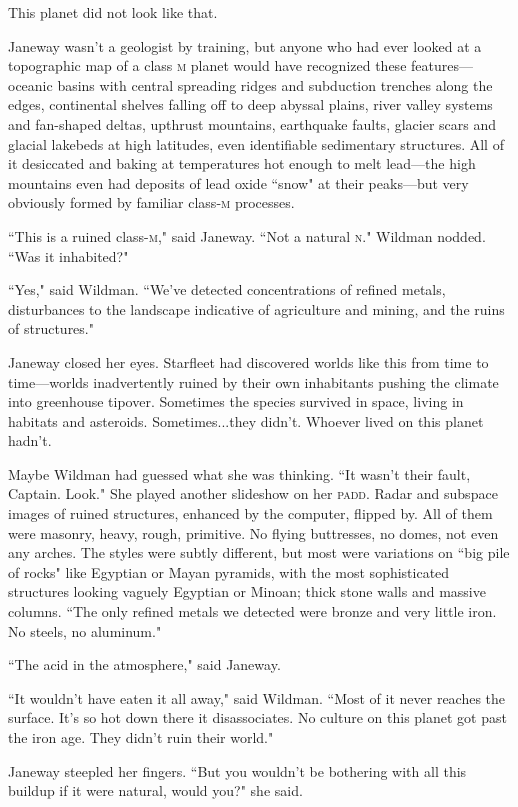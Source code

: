 \documentclass[twoside,letterpaper,12pt]{memoir}
\begin{document}
This planet did not look like that.

Janeway wasn't a geologist by training, but anyone who had ever looked at a topographic map of a class \textsc{m} planet would have recognized these features---oceanic basins with central spreading ridges and subduction trenches along the edges, continental shelves falling off to deep abyssal plains, river valley systems and fan-shaped deltas, upthrust mountains, earthquake faults, glacier scars and glacial lakebeds at high latitudes, even identifiable sedimentary structures. All of it desiccated and baking at temperatures hot enough to melt lead---the high mountains even had deposits of lead oxide ``snow" at their peaks---but very obviously formed by familiar class-\textsc{m} processes.

``This is a ruined class-\textsc{m}," said Janeway. ``Not a natural \textsc{n}." Wildman nodded. ``Was it inhabited?"

``Yes," said Wildman. ``We've detected concentrations of refined metals, disturbances to the landscape indicative of agriculture and mining, and the ruins of structures."

Janeway closed her eyes. Starfleet had discovered worlds like this from time to time---worlds inadvertently ruined by their own inhabitants pushing the climate into greenhouse tipover. Sometimes the species survived in space, living in habitats and asteroids. Sometimes...they didn't. Whoever lived on this planet hadn't.

Maybe Wildman had guessed what she was thinking. ``It wasn't their fault, Captain. Look." She played another slideshow on her \textsc{padd}. Radar and subspace images of ruined structures, enhanced by the computer, flipped by. All of them were masonry, heavy, rough, primitive. No flying buttresses, no domes, not even any arches. The styles were subtly different, but most were variations on ``big pile of rocks" like Egyptian or Mayan pyramids, with the most sophisticated structures looking vaguely Egyptian or Minoan; thick stone walls and massive columns. ``The only refined metals we detected were bronze and very little iron. No steels, no aluminum."

``The acid in the atmosphere," said Janeway.

``It wouldn't have eaten it all away," said Wildman. ``Most of it never reaches the surface. It's so hot down there it disassociates. No culture on this planet got past the iron age. They didn't ruin their world."

Janeway steepled her fingers. ``But you wouldn't be bothering with all this buildup if it were natural, would you?" she said.
\end{document}
